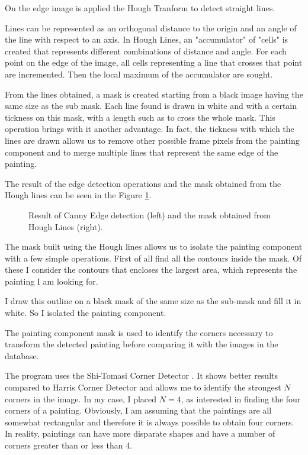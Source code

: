 \documentclass[10pt,twocolumn,letterpaper]{article}
\begin{document}
On the edge image is applied the Hough Tranform \cite{ballard1987generalizing} to detect straight lines. 

Lines can be represented as an orthogonal distance to the origin and an angle of the line with respect to an axis. In Hough Lines, an "accumulator" of "cells" is created that represents different combinations of distance and angle. For each point on the edge of the image, all cells representing a line that crosses that point are incremented. Then the local maximum of the accumulator are sought.

From the lines obtained, a mask is created starting from a black image having the same size as the sub mask. Each line found is drawn in white and with a certain tickness on this mask, with a length such as to cross the whole mask. This operation brings with it another advantage. In fact, the tickness with which the lines are drawn allows us to remove other possible frame pixels from the painting component and to merge multiple lines that represent the same edge of the painting.

The result of the edge detection operations and the mask obtained from the Hough lines can be seen in the Figure \ref{fig:cannyHough}.

\begin{figure}[t]
   \begin{center}
   \fbox{\rule{0pt}{2in} \rule{0.9\linewidth}{0pt}}
   \end{center}
      \caption{Result of Canny Edge detection (left) and the mask obtained from Hough Lines (right).}
   \label{fig:cannyHough}
\end{figure}


The mask built using the Hough lines allows us to isolate the painting component with a few simple operations. First of all find all the contours inside the mask. Of these I consider the contours that encloses the largest area, which represents the painting I am looking for.

I draw this outline on a black mask of the same size as the sub-mask and fill it in white. So I isolated the painting component.

The painting component mask is used to identify the corners necessary to transform the detected painting before comparing it with the images in the database.

The program uses the Shi-Tomasi Corner Detector \cite{shi1994good}. It shows better results compared to Harris Corner Detector \cite{harris1988combined} and allows me to identify the strongest $N$ corners in the image. In my case, I placed $N = 4$, as interested in finding the four corners of a painting. Obviously, I am assuming that the paintings are all somewhat rectangular and therefore it is always possible to obtain four corners. In reality, paintings can have more disparate shapes and have a number of corners greater than or less than 4.
\end{document}
